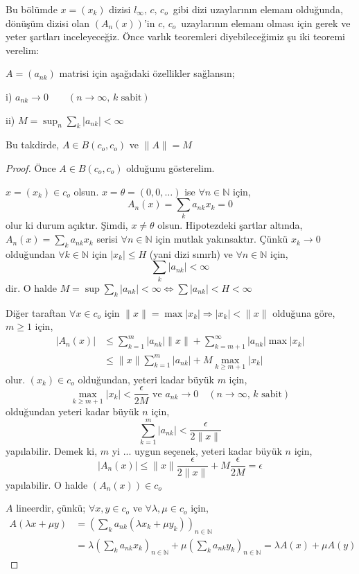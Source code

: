 Bu bölümde $x=(x_k)$ dizisi $l_\infty,\,c,\,c_o\,$ gibi dizi uzaylarının elemanı olduğunda, dönüşüm dizisi olan $(A_n(x))$'in $c,\,c_o\,$ uzaylarının elemanı olması için gerek ve yeter şartları inceleyeceğiz. Önce varlık teoremleri diyebileceğimiz şu iki teoremi verelim:
\begin{theorem} $A=(a_{nk})$ matrisi için aşağıdaki özellikler sağlansın;
\item[i)] $a_{nk}\to 0\qquad(n\to\infty,\,k\text{ sabit})$
\item[ii)] $M=\sup_n\sum\limits_k|a_{nk}|<\infty$

Bu takdirde, $A\in B(c_o,c_o)$ ve $\|A\|=M$
\end{theorem}
\begin{proof}
Önce $A\in B(c_o,c_o)$ olduğunu gösterelim. 

$x=(x_k)\in c_o$ olsun. $x=\theta=(0,0,\ldots)$ ise $\forall n\in\mathbb{N}$ için,
$$
A_n(x)=\sum_ka_{nk}x_k=0
$$
olur ki durum açıktır. Şimdi, $x\neq\theta$ olsun. Hipotezdeki şartlar altında,\\
$A_n(x)=\sum\limits_ka_{nk}x_k$ serisi $\forall n\in \mathbb{N}$ için mutlak yakınsaktır. Çünkü $x_k\to 0$ olduğundan $\forall k\in\mathbb{N}$ için $|x_k|\leq H$ (yani dizi sınırlı) ve $\forall n\in\mathbb{N}$ için,
$$
\sum\limits_k|a_{nk}|<\infty
$$
dir. O halde $M=\sup\sum\limits_k|a_{nk}|<\infty\iff\sum|a_{nk}|<H<\infty$

Diğer taraftan $\forall x\in c_o$ için $\|x\|=\max|x_k|\Rightarrow |x_k|<\|x\|$ olduğuna göre, $m\geq 1$ için,
$$\begin{aligned}
|A_n(x)|&\leq\sum\limits_{k=1}^m|a_{nk}|\|x\|+\sum\limits_{k=m+1}^\infty|a_{nk}|\max|x_k|\\
&\leq\|x\|\sum\limits_{k=1}^m|a_{nk}|+M\max\limits_{k\geq m+1}|x_k|
\end{aligned}$$
olur. $(x_k)\in c_o$ olduğundan, yeteri kadar büyük $m$ için,
$$
\max\limits_{k\geq m+1} |x_k|<\frac{\epsilon}{2M} \text{ ve } a_{nk}\to 0\quad(n\to\infty,\,k\text{ sabit})
$$
olduğundan yeteri kadar büyük $n$ için,
$$
\sum\limits_{k=1}^m|a_{nk}|<\frac{\epsilon}{2\|x\|}
$$
yapılabilir. Demek ki, $m$ yi ... uygun seçenek, yeteri kadar büyük $n$ için,
$$
|A_n(x)|\leq \|x\|\frac{\epsilon}{2\|x\|}+M\frac{\epsilon}{2M}=\epsilon
$$
yapılabilir. O halde $(A_n(x))\in c_o$

$A$ lineerdir, çünkü; $\forall x,y\in c_o$ ve $\forall \lambda,\mu \in c_o$ için,
$$\begin{aligned}
A(\lambda x+\mu y)&=\left(\sum_ka_{nk}(\lambda x_k+\mu y_k)\right)_{n\in\mathbb{N}}\\
&=\lambda\left(\sum_ka_{nk}x_k\right)_{n\in\mathbb{N}}+\mu \left(\sum_ka_{nk}y_k\right)_{n\in\mathbb{N}}=\lambda A(x)+\mu A(y)
\end{aligned}$$


\end{proof}
